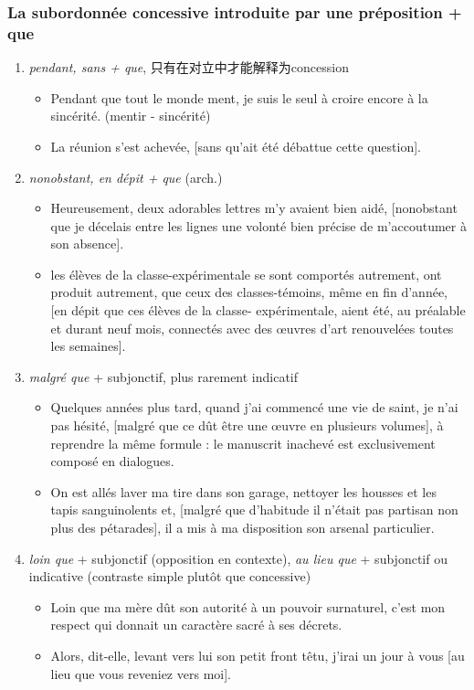 \documentclass[UTF8]{report}
\begin{document}
\subsubsection{La subordonnée concessive introduite par une préposition + que}
\begin{enumerate}
    \item \textit{pendant, sans + que}, 只有在对立中才能解释为concession 
    \begin{itemize}
        \item Pendant que tout le monde ment, je suis le seul à croire encore à la sincérité. (mentir - sincérité)
        \item La réunion s’est achevée, [sans qu’ait été débattue cette question].
    \end{itemize}
    \item \textit{nonobstant, en dépit + que} (arch.)
    \begin{itemize}
        \item Heureusement, deux adorables lettres m’y avaient bien aidé, [nonobstant que je décelais entre les lignes une volonté bien précise de m’accoutumer à son absence]. 
        \item les élèves de la classe-expérimentale se sont comportés autrement, ont produit autrement, que ceux des classes-témoins, même en fin d’année, [en dépit que ces élèves de la classe- expérimentale, aient été, au préalable et durant neuf mois, connectés avec des œuvres d’art renouvelées toutes les semaines].
    \end{itemize}
    \item \textit{malgré que} + subjonctif, plus rarement indicatif
    \begin{itemize}
        \item Quelques années plus tard, quand j’ai commencé une vie de saint, je n’ai pas hésité, [malgré que ce dût être une œuvre en plusieurs volumes], à reprendre la même formule : le manuscrit inachevé est exclusivement composé en dialogues.
        \item On est allés laver ma tire dans son garage, nettoyer les housses et les tapis sanguinolents et, [malgré que d’habitude il n’était pas partisan non plus des pétarades], il a mis à ma disposition son arsenal particulier.
    \end{itemize}
    \item \textit{loin que} + subjonctif (opposition en contexte), \textit{au lieu que} + subjonctif ou indicative (contraste simple plutôt que concessive)
    \begin{itemize}
        \item Loin que ma mère dût son autorité à un pouvoir surnaturel, c’est mon respect qui donnait un caractère sacré à ses décrets.
        \item Alors, dit-elle, levant vers lui son petit front têtu, j’irai un jour à vous [au lieu que vous reveniez vers moi]. 
    \end{itemize}
\end{enumerate}
\end{document}
